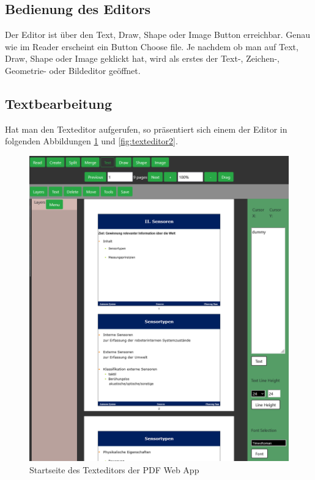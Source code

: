\subsection{Bedienung des Editors}
Der Editor ist über den Text, Draw, Shape oder Image Button erreichbar. Genau wie im Reader erscheint ein Button Choose file. Je nachdem ob man auf Text, Draw, Shape oder Image geklickt hat, wird als erstes der Text-, Zeichen-, Geometrie- oder Bildeditor geöffnet.

\subsection{Textbearbeitung}
Hat man den Texteditor aufgerufen, so präsentiert sich einem der Editor in folgenden Abbildungen \ref{fig:texteditor} und \ref{fig:texteditor2}.

\begin{figure}[!htbp]
	\centering
	\includegraphics[width=1\textwidth]{"images/texteditor.png"}
	\caption{Startseite des Texteditors der PDF Web App}
	\label{fig:texteditor}
\end{figure}


